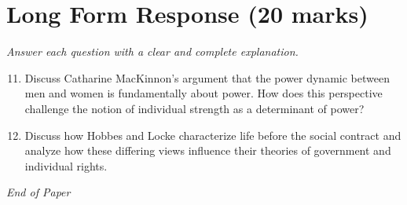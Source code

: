 \documentclass[12pt]{article}
\begin{document}
\section*{Long Form Response (20 marks)}
\textit{Answer each question with a clear and complete explanation.}
\begin{enumerate}[label=\arabic*.]
\setcounter{enumi}{10}
\item Discuss Catharine MacKinnon's argument that the power dynamic between men and women is fundamentally about power. How does this perspective challenge the notion of individual strength as a determinant of power?
\item Discuss how Hobbes and Locke characterize life before the social contract and analyze how these differing views influence their theories of government and individual rights.
\end{enumerate}

\vfill
\noindent\textit{End of Paper}
\end{document}
